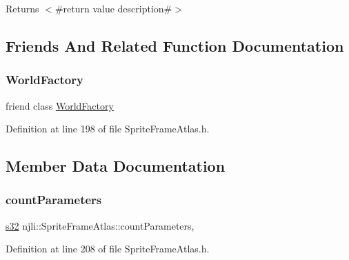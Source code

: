 \begin{DoxyReturn}{Returns}
$<$\#return value description\#$>$ 
\end{DoxyReturn}


\subsection{Friends And Related Function Documentation}
\mbox{\label{classnjli_1_1_sprite_frame_atlas_acb96ebb09abe8f2a37a915a842babfac}} 
\subsubsection{\texorpdfstring{World\+Factory}{WorldFactory}}
{\footnotesize\ttfamily friend class \mbox{\hyperlink{classnjli_1_1_world_factory}{World\+Factory}}\hspace{0.3cm}{\ttfamily [friend]}}



Definition at line 198 of file Sprite\+Frame\+Atlas.\+h.



\subsection{Member Data Documentation}
\mbox{\label{classnjli_1_1_sprite_frame_atlas_a8e1e4a08c88fe319fccddd4e34043016}} 
\subsubsection{\texorpdfstring{count\+Parameters}{countParameters}}
{\footnotesize\ttfamily \mbox{\hyperlink{_util_8h_aa62c75d314a0d1f37f79c4b73b2292e2}{s32}} njli\+::\+Sprite\+Frame\+Atlas\+::count\+Parameters\hspace{0.3cm}{\ttfamily [static]}, {\ttfamily [protected]}}



Definition at line 208 of file Sprite\+Frame\+Atlas.\+h.

